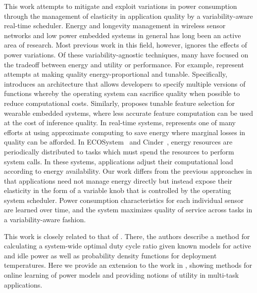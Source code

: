 This work attempts to mitigate and exploit variations in power consumption through the management of elasticity in application quality by a variability-aware real-time scheduler.
Energy and longevity management in wireless sensor networks and low power embedded systems in general has long been an active area of research. Most previous work in this field, however, ignores the effects of power variations.
Of these variability-agnostic techniques, many have focused on the tradeoff between energy and utility or performance.  For example, \cite{green2010,ghasemzadeh2012} represent attempts at making quality energy-proportional and tunable.  Specifically, \cite{green2010} introduces an architecture that allows developers to specify multiple versions of functions whereby the operating system can sacrifice quality when possible to reduce computational costs.  Similarly, \cite{ghasemzadeh2012} proposes tunable feature selection for wearable embedded systems, where less accurate feature computation can be used at the cost of inference quality. In real-time systems, \cite{liu1994} represents one of many efforts at using approximate computing to save energy where marginal losses in quality can be afforded. In ECOSystem~\cite{Zeng:2002} and Cinder~\cite{Rumble:2009}, energy resources are periodically distributed to tasks which must spend the resources to perform system calls. In these systems, applications adjust their computational load according to energy availability. Our work differs from the previous approaches in that applications need not manage energy directly but instead expose their elasticity in the form of a variable knob that is controlled by the operating system scheduler. Power consumption characteristics for each individual sensor are learned over time, and the system maximizes quality of service across tasks in a variability-aware fashion. 




This work is closely related to that of \cite{Wanner:2012}.  There, the authors describe a method for calculating a system-wide optimal duty cycle ratio given known models for active and idle power as well as probability density functions for deployment temperatures. Here we provide an extension to the work in \cite{Wanner:2012}, showing methods for online learning of power models and providing notions of utility in multi-task applications.  


